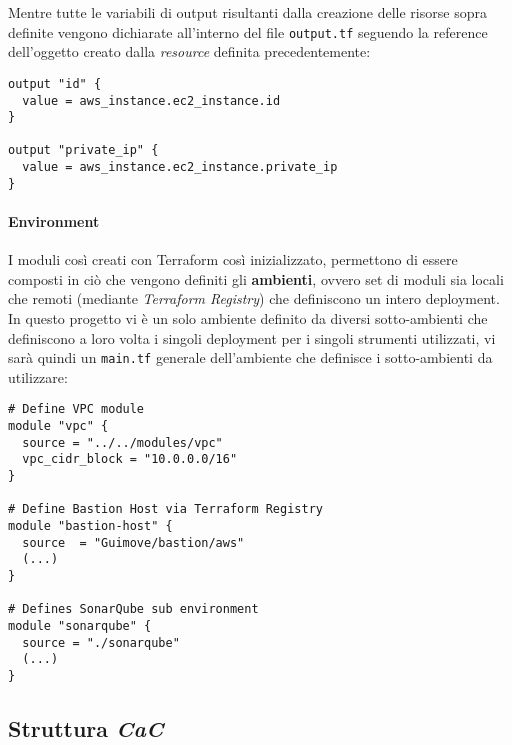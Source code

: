 \documentclass[../main.tex]{subfiles}
\begin{document}
        	    Mentre tutte le variabili di output risultanti dalla creazione delle risorse sopra definite vengono dichiarate all'interno del file \verb|output.tf| seguendo la reference dell'oggetto creato dalla \emph{resource} definita precedentemente:
        	    \begin{lstlisting}
output "id" {
  value = aws_instance.ec2_instance.id
}

output "private_ip" {
  value = aws_instance.ec2_instance.private_ip
}
        	    \end{lstlisting}
        	
            	\paragraph{Environment}
            	I moduli così creati con Terraform così inizializzato, permettono di essere composti in ciò che vengono definiti gli \textbf{ambienti}, ovvero set di moduli sia locali che remoti (mediante \emph{Terraform Registry}) che definiscono un intero deployment. In questo progetto vi è un solo ambiente definito da diversi sotto-ambienti che definiscono a loro volta i singoli deployment per i singoli strumenti utilizzati, vi sarà quindi un \verb|main.tf| generale dell'ambiente che definisce i sotto-ambienti da utilizzare:
            	\begin{lstlisting}
# Define VPC module
module "vpc" {
  source = "../../modules/vpc"
  vpc_cidr_block = "10.0.0.0/16"
}

# Define Bastion Host via Terraform Registry
module "bastion-host" {
  source  = "Guimove/bastion/aws"
  (...)
}

# Defines SonarQube sub environment
module "sonarqube" {
  source = "./sonarqube"
  (...)
}
            	\end{lstlisting}
    	
    	    \subsection{Struttura \emph{CaC}}
    	    
\end{document}
